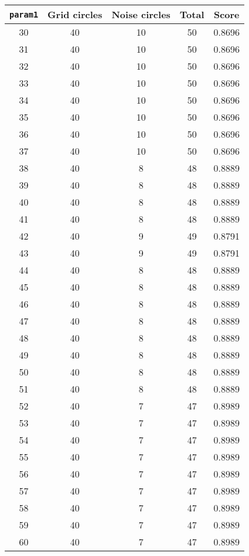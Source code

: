 \documentclass[letterpaper, 12pt]{article}
\begin{document}
\begin{longtable}{|c|c|c|c|c|}
\hline
\textbf{\texttt{param1}} & \textbf{Grid circles} & \textbf{Noise circles} & \textbf{Total} & \textbf{Score} \\
\hline
30 & 40 & 10 & 50 & 0.8696 \\
\hline
31 & 40 & 10 & 50 & 0.8696 \\
\hline
32 & 40 & 10 & 50 & 0.8696 \\
\hline
33 & 40 & 10 & 50 & 0.8696 \\
\hline
34 & 40 & 10 & 50 & 0.8696 \\
\hline
35 & 40 & 10 & 50 & 0.8696 \\
\hline
36 & 40 & 10 & 50 & 0.8696 \\
\hline
37 & 40 & 10 & 50 & 0.8696 \\
\hline
38 & 40 & 8 & 48 & 0.8889 \\
\hline
39 & 40 & 8 & 48 & 0.8889 \\
\hline
40 & 40 & 8 & 48 & 0.8889 \\
\hline
41 & 40 & 8 & 48 & 0.8889 \\
\hline
42 & 40 & 9 & 49 & 0.8791 \\
\hline
43 & 40 & 9 & 49 & 0.8791 \\
\hline
44 & 40 & 8 & 48 & 0.8889 \\
\hline
45 & 40 & 8 & 48 & 0.8889 \\
\hline
46 & 40 & 8 & 48 & 0.8889 \\
\hline
47 & 40 & 8 & 48 & 0.8889 \\
\hline
48 & 40 & 8 & 48 & 0.8889 \\
\hline
49 & 40 & 8 & 48 & 0.8889 \\
\hline
50 & 40 & 8 & 48 & 0.8889 \\
\hline
51 & 40 & 8 & 48 & 0.8889 \\
\hline
52 & 40 & 7 & 47 & 0.8989 \\
\hline
53 & 40 & 7 & 47 & 0.8989 \\
\hline
54 & 40 & 7 & 47 & 0.8989 \\
\hline
55 & 40 & 7 & 47 & 0.8989 \\
\hline
56 & 40 & 7 & 47 & 0.8989 \\
\hline
57 & 40 & 7 & 47 & 0.8989 \\
\hline
58 & 40 & 7 & 47 & 0.8989 \\
\hline
59 & 40 & 7 & 47 & 0.8989 \\
\hline
60 & 40 & 7 & 47 & 0.8989 \\
\hline

\end{longtable}
\end{document}
